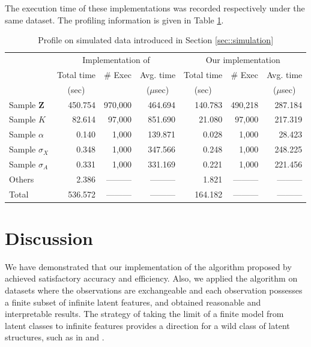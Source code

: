 \documentclass{article}
\begin{document}
The execution time of these implementations was recorded respectively under the same dataset. The profiling information is given in Table \ref{tbl::cmp}.

\begin{table}[!h]
  \centering
  \small
  \caption{Profile on simulated data introduced in Section \ref{sec::simulation}}
  \label{tbl::cmp}
  \begin{tabular}{lrrrrrr}
    \toprule
    & \multicolumn{3}{c}{Implementation of \citet{chai}} & \multicolumn{3}{c}{Our implementation} \\
    & \multicolumn{1}{c}{Total time}& \multicolumn{1}{c}{\# Exec} & \multicolumn{1}{c}{Avg. time} & \multicolumn{1}{c}{Total time}& \multicolumn{1}{c}{\# Exec} & \multicolumn{1}{c}{Avg. time} \\
    & \multicolumn{1}{c}{\scriptsize(sec)} & \multicolumn{1}{c}{} & \multicolumn{1}{c}{\scriptsize($\mu$sec)} & \multicolumn{1}{c}{\scriptsize(sec)} & \multicolumn{1}{c}{} & \multicolumn{1}{c}{\scriptsize($\mu$sec)} \\
    \midrule
    Sample $\mathbf{Z}$ & 450.754 & 970,000 & 464.694 & 140.783 & 490,218 & 287.184 \\
    Sample $K$ & 82.614 & 97,000 & 851.690 & 21.080 & 97,000 & 217.319 \\
    Sample $\alpha$ & 0.140 & 1,000 & 139.871 & 0.028 & 1,000 & 28.423\\
    Sample $\sigma_X$ & 0.348 & 1,000 & 347.566 & 0.248 & 1,000 & 248.225\\
    Sample $\sigma_A$ & 0.331 & 1,000 & 331.169 & 0.221 & 1,000 & 221.456\\
    Others & 2.386 & --------- & --------- & 1.821 & --------- & ---------\\
    Total & 536.572 & --------- & --------- & 164.182 & --------- & ---------\\
    \bottomrule
  \end{tabular}
\end{table}

\section{Discussion}\label{sec::discussion}
We have demonstrated that our implementation of the algorithm proposed by \citet{griffiths2005infinite} achieved satisfactory accuracy and efficiency. Also, we applied the algorithm on datasets where the observations are exchangeable and each observation possesses a finite subset of infinite latent features, and obtained reasonable and interpretable results. The strategy of taking the limit of a finite model from latent classes to infinite features provides a direction for a wild class of latent structures, such as in \citet{teh2006hierarchical} and \citet{chen2011hierarchical}.
\end{document}
